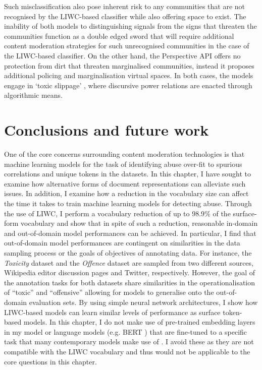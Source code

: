 Such misclassification also pose inherent risk to any communities that are not recognised by the LIWC-based classifier while also offering space to exist. The inability of both models to distinguishing signals from the signs that threaten the communities function as a double edged sword that will require additional content moderation strategies for such unrecognised communities in the case of the LIWC-based classifier. On the other hand, the Perspective API offers no protection from dirt that threaten marginalised communities, instead it proposes additional policing and marginalisation virtual spaces. In both cases, the models engage in `toxic slippage' \citep{Risam:2015}, where discursive power relations are enacted through algorithmic means.

\section{Conclusions and future work}

One of the core concerns surrounding content moderation technologies is that machine learning models for the task of identifying abuse over-fit to spurious correlations and unique tokens in the datasets. In this chapter, I have sought to examine how alternative forms of document representations can alleviate such issues. In addition, I examine how a reduction in the vocabulary size can affect the time it takes to train machine learning models for detecting abuse.
Through the use of LIWC, I perform a vocabulary reduction of up to $98.9\%$ of the surface-form vocabulary and show that in spite of such a reduction, reasonable in-domain and out-of-domain model performances can be achieved. In particular, I find that out-of-domain model performances are contingent on similarities in the data sampling process or the goals of objectives of annotating data.
For instance, the \textit{Toxicity} dataset and the \textit{Offence} dataset are sampled from two different sources, Wikipedia editor discussion pages and Twitter, respectively. However, the goal of the annotation tasks for both datasets share similarities in the operationalisation of ``toxic'' and ``offensive'' allowing for models to generalise onto the out-of-domain evaluation sets.
By using simple neural network architectures, I show how LIWC-based models can learn similar levels of performance as surface token-based models. In this chapter, I do not make use of pre-trained embedding layers \citep{Park:2017,Kolhatkar:2021} in my model or language models (e.g. BERT \citep{Devlin:2019}) that are fine-tuned to a specific task that many contemporary models make use of \citep{Vidgen:2021,Isaksen:2020}. I avoid these as they are not compatible with the LIWC vocabulary and thus would not be applicable to the core questions in this chapter. 

